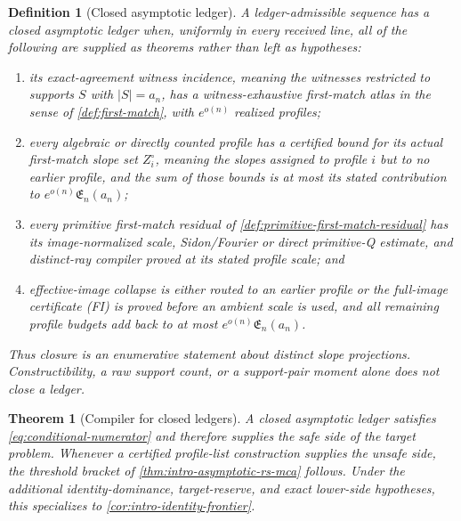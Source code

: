\documentclass[12pt,a4paper]{amsart}
\numberwithin{equation}{section}
\newtheorem{theorem}{Theorem}[section]
\newtheorem{definition}[definition]{Definition}
\theoremstyle{remark}
\newcommand{\abs}[1]{\lvert #1\rvert}
\begin{document}
\begin{definition}[Closed asymptotic ledger]\label{def:closed-asymptotic-ledger}
A ledger-admissible sequence has a \emph{closed asymptotic ledger} when,
uniformly in every received line, all of the following are supplied as
theorems rather than left as hypotheses:
\begin{enumerate}[label=\textup{(L\arabic*)},leftmargin=*]
\item its \emph{exact-agreement witness incidence}, meaning the witnesses
      restricted to supports \(S\) with \(\abs S=a_n\), has a witness-exhaustive
      first-match atlas in the sense of \cref{def:first-match}, with
      \(e^{o(n)}\) realized profiles;
\item every algebraic or directly counted profile has a certified bound
      for its actual first-match slope set \(Z_i^\circ\), meaning the
      slopes assigned to profile \(i\) but to no earlier profile, and the sum of
      those bounds is at most its stated contribution to
      \(e^{o(n)}\mathfrak E_n(a_n)\);
\item every primitive first-match residual of
      \cref{def:primitive-first-match-residual} has its image-normalized
      scale, Sidon/Fourier or direct primitive-Q estimate, and distinct-ray
      compiler proved at its stated profile scale; and
\item effective-image collapse is either routed to an earlier profile or
      the full-image certificate \textup{(FI)} is proved before an ambient
      scale is used, and all remaining profile budgets add back to at most
      \(e^{o(n)}\mathfrak E_n(a_n)\).
\end{enumerate}
Thus closure is an enumerative statement about distinct slope projections.
Constructibility, a raw support count, or a support-pair moment alone does
not close a ledger.
\end{definition}

\begin{theorem}[Compiler for closed ledgers]\label{thm:main-ledger}
A closed asymptotic ledger satisfies \eqref{eq:conditional-numerator} and
therefore supplies the safe side of the target problem.  Whenever a
certified profile-list construction supplies the unsafe side, the threshold
bracket of \cref{thm:intro-asymptotic-rs-mca} follows.  Under the additional
identity-dominance, target-reserve, and exact lower-side hypotheses, this
specializes to \cref{cor:intro-identity-frontier}.
\end{theorem}
\end{document}
